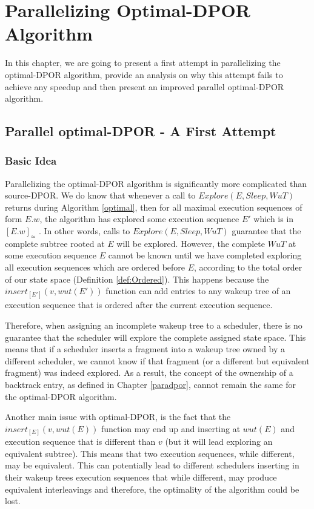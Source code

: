 \chapter{Parallelizing Optimal-DPOR Algorithm}
\label{paradpor_opt}

In this chapter, we are going to present a first attempt in parallelizing the optimal-DPOR
algorithm, provide an analysis on why this attempt fails to achieve any speedup and then present 
an improved parallel optimal-DPOR algorithm.


\section{Parallel optimal-DPOR - A First Attempt}

\subsection{Basic Idea}

Parallelizing the optimal-DPOR algorithm is significantly more complicated than source-DPOR. We do know that whenever a call to 
$Explore(E, Sleep, WuT)$ returns during Algorithm \ref{optimal}, then for all maximal execution sequences
of form $E.w$, the algorithm has explored some execution sequence $E'$ which is in $[E.w]_\simeq$ \cite{AbdullaAronisJohnssonSagonasDPOR2014}. In other words, calls to $Explore(E, Sleep, WuT)$ guarantee that the complete subtree rooted
at $E$ will be explored.
However, the complete $WuT$ at some execution sequence $E$ cannot be known until we have completed
exploring all execution sequences which are ordered before $E$, according to the total order of our state space
(Definition \ref{def:Ordered}). This happens because the $insert_{[E']}(v,wut(E'))$ function can add
entries to any wakeup tree of an execution sequence that is ordered after the current execution sequence.

Therefore, when assigning an incomplete wakeup tree to a scheduler, there is no
guarantee that the scheduler will explore the complete assigned state space. This means that if a
scheduler inserts a fragment into a wakeup tree owned by a different scheduler, we cannot know if that 
fragment (or a different but equivalent fragment) was indeed explored. As a result, the concept of the ownership of a 
backtrack entry, as defined in Chapter \ref{paradpor}, cannot remain the same for the optimal-DPOR algorithm.

Another main issue with optimal-DPOR, is the fact that the $insert_{[E]}(v,wut(E))$ function may end up
 and inserting at $wut(E)$ and execution sequence that is different than $v$ (but it will lead exploring an equivalent subtree). This means that two execution sequences, while different,
may be equivalent. This can potentially lead to different schedulers inserting in their
wakeup trees execution sequences that while different, may produce equivalent interleavings and therefore, the optimality
of the algorithm could be lost.

